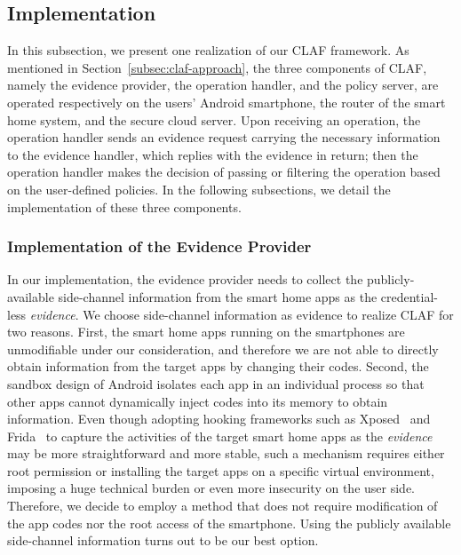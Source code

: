 \documentclass[letterpaper,12pt]{article}
\begin{document}
\subsection{Implementation}
\label{subsec:claf-impl}
In this subsection, we present one realization of our CLAF framework. %
%
As mentioned in Section~\ref{subsec:claf-approach}, the three components of CLAF, namely the evidence provider, the operation handler, and the policy server, are operated respectively on the users' Android smartphone, the router of the smart home system, and the secure cloud server. Upon receiving an operation, the operation handler sends an evidence request carrying the necessary information to the evidence handler, which replies with the evidence in return; then the operation handler makes the decision of passing or filtering the operation based on the user-defined policies. In the following subsections, we detail the implementation of these three components.

\subsubsection{Implementation of the Evidence Provider}
In our implementation, the evidence provider needs to collect the publicly-available side-channel information from the smart home apps as the credential-less \textit{evidence}. We choose side-channel information as evidence to realize CLAF for two reasons. First, the smart home apps running on the smartphones are unmodifiable under our consideration, and therefore we are not able to directly obtain information from the target apps by changing their codes. Second, the sandbox design of Android isolates each app in an individual process so that other apps cannot dynamically inject codes into its memory to obtain information.  Even though adopting hooking frameworks such as Xposed~\cite{xposed} and Frida~\cite{frida} to capture the activities of the target smart home apps as the \textit{evidence} may be more straightforward and more stable, such a mechanism requires either root permission or installing the target apps on a specific virtual environment, imposing a huge technical burden or even more insecurity on the user side. %
Therefore, we decide to employ a method that does not require modification of the app codes nor the root access of the smartphone. Using the publicly available side-channel information turns out to be our best option.
\end{document}
